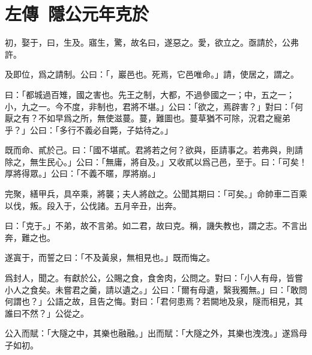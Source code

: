 \section[鄭伯克段於鄢\quad{\small 左傳\ 隱公元年}]{{\normalsize 左傳\ 隱公元年}\quad {}克於}
初，娶于，曰，生及。寤生，驚，故名曰，遂惡之。愛，欲立之。亟請於，公弗許。

及即位，爲之請制。公曰：「，巖邑也。死焉，它邑唯命。」請，使居之，謂之。

曰：「都城過百雉，國之害也。先王之制，大都，不過參國之一；中，五之一；小，九之一。今不度，非制也，君將不堪。」公曰：「欲之，焉辟害？」對曰：「何厭之有？不如早爲之所，無使滋蔓。蔓，難圖也。蔓草猶不可除，況君之寵弟乎？」公曰：「多行不義必自斃，子姑待之。」

既而命、貳於己。曰：「國不堪貳。君將若之何？欲與，臣請事之。若弗與，則請除之，無生民心。」公曰：「無庸，將自及。」又收貳以爲己邑，至于。曰：「可矣！厚將得眾。」公曰：「不義不暱，厚將崩。」

完聚，繕甲兵，具卒乘，將襲；夫人將啟之。公聞其期曰：「可矣。」命帥車二百乘以伐，叛。段入于，公伐諸。五月辛丑，出奔。

曰：「克于。」不弟，故不言弟。如二君，故曰克。稱，譏失教也，謂之志。不言出奔，難之也。

遂寘于，而誓之曰：「不及黃泉，無相見也。」既而悔之。

爲封人，聞之。有獻於公，公賜之食，食舍肉，公問之。對曰：「小人有母，皆嘗小人之食矣。未嘗君之羹，請以遺之。」公曰：「爾有母遺，繄我獨無。」曰：「敢問何謂也？」公語之故，且告之悔。對曰：「君何患焉？若闕地及泉，隧而相見，其誰曰不然？」公從之。

公入而賦：「大隧之中，其樂也融融。」出而賦：「大隧之外，其樂也洩洩。」遂爲母子如初。


